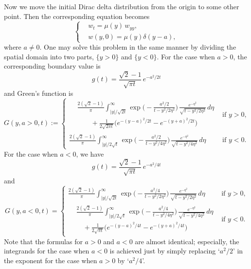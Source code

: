 \documentclass[11pt]{amsart}
\begin{document}
Now we move the initial Dirac delta distribution from the origin to some other point. Then the corresponding equation becomes
\[ \left\{ \begin{aligned}
&w_t = \mu(y) \,w_{yy}, \\
&w(y,0) = \mu(y) \delta(y-a),
\end{aligned} \right. \]
where $a\ne0$. One may solve this problem in the same manner by dividing the spatial domain into two parts,  $\{y>0\}$ and $\{y<0\}$. For the case when $a > 0$, the corresponding boundary value is
\[
g(t)= \frac{\sqrt{2} - 1}{\sqrt{\pi t}} \,e^{-a^2/2t}
\]
and Green's function is
\begin{equation}\label{G+}
G(y,a>0,t):=
\begin{cases}
\begin{split}
& \textstyle \frac{2(\sqrt{2}-1)}{\pi} \int_{|y|/\sqrt{2 t}}^\infty \exp\Big(- \frac{a^2/2}{t - y^2/2\eta^2}\Big)  \, \frac{e^{-\eta^2}}{\sqrt{t - y^2/2\eta^2}} \,d\eta\\
& \textstyle \qquad + \frac{1}{2\sqrt{2\pi t}} \big( e^{-(y-a)^2/2t} - e^{-(y+a)^2/2t} \big)
\end{split}
& \text{if $y>0$,} \\
\frac{2(\sqrt{2}-1)}{\pi} \int_{|y|/2\sqrt{t}}^\infty \exp\Big( -\frac{a^2/2}{t-y^2/4\eta^2} \Big) \, \frac{e^{-\eta^2}}{\sqrt{t - y^2/4\eta^2}} \,d\eta & \text{if $y < 0$.}
\end{cases}
\end{equation}
For the case when $a < 0$, we have
\[ g(t) = \frac{\sqrt{2} - 1}{\sqrt{\pi t}} \,e^{-a^2/4t} \]
and
\begin{equation}\label{G-}
G(y,a<0,t)=\begin{cases}
\frac{2(\sqrt{2}-1)}{\pi} \int_{|y|/\sqrt{2t}}^\infty \exp\Big( -\frac{a^2/4}{t-y^2/2\eta^2} \Big) \, \frac{e^{-\eta^2}}{\sqrt{t - y^2/2\eta^2}} \,d\eta & \text{if $y > 0$,} \\
\begin{split}
& \textstyle \frac{2(\sqrt{2}-1)}{\pi} \int_{|y|/2\sqrt{t}}^\infty \exp\Big( - \frac{a^2/4}{t - y^2/4\eta^2} \Big) \, \frac{e^{-\eta^2}}{\sqrt{t - y^2/4\eta^2}} \,d\eta \\
& \textstyle \quad + \frac{1}{2\sqrt{\pi t}} \big( e^{-(y-a)^2/4t} - e^{-(y+a)^2/4t} \big)
\end{split}
& \text{if $y < 0$.}
\end{cases}
\end{equation}
Note that the formulas for $a > 0$ and $a < 0$ are almost identical; especially, the integrands for the case when $a < 0$ is achieved just by simply replacing `$a^2/2$' in the exponent for the case when $a > 0$ by `$a^2/4$'.
\end{document}
